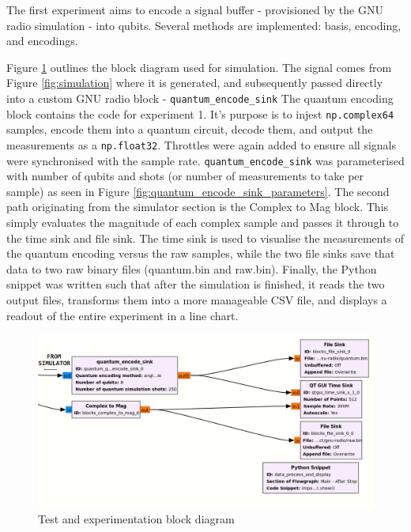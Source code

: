 The first experiment aims to encode a signal buffer - provisioned by the GNU radio simulation - into qubits.
Several methods are implemented: basis, encoding, and encodings.

Figure \ref{fig:encoding} outlines the block diagram used for simulation.
The signal comes from Figure \ref{fig:simulation} where it is generated, and subsequently passed directly into a custom GNU radio block - \lstinline{quantum_encode_sink}
The quantum encoding block contains the code for experiment 1.
It's purpose is to injest \lstinline{np.complex64} samples, encode them into a quantum circuit, decode them, and output the measurements as a \lstinline{np.float32}.
Throttles were again added to ensure all signals were synchronised with the sample rate.
\lstinline{quantum_encode_sink} was parameterised with number of qubits and shots (or number of measurements to take per sample) as seen in Figure \ref{fig:quantum_encode_sink_parameters}.
The second path originating from the simulator section is the Complex to Mag block. This simply evaluates the magnitude of each complex sample and passes it through to the time sink and file sink.
The time sink is used to visualise the measurements of the quantum encoding versus the raw samples, while the two file sinks save that data to two raw binary files (quantum.bin and raw.bin).
Finally, the Python snippet was written such that after the simulation is finished, it reads the two output files, transforms them into a more manageable CSV file, and displays a readout of the entire experiment in a line chart.
% 
\begin{figure}[ht]
    \centering
    \includegraphics[width=1\textwidth]{Figures/encoding.png}
    \caption{Test and experimentation block diagram}
    \label{fig:encoding}
\end{figure}
% 
